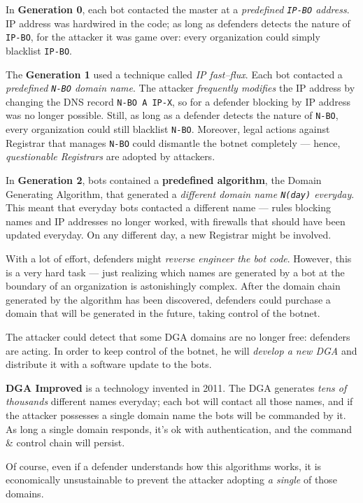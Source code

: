 \documentclass[10pt]{extreport}
\begin{document}
In \textbf{Generation 0}, each bot contacted the master at a \emph{predefined
\texttt{IP-BO} address}. IP address was hardwired in the code; as long as
defenders detects the nature of \texttt{IP-BO}, for the attacker it was game
over: every organization could simply blacklist \texttt{IP-BO}.

The \textbf{Generation 1} used a technique called \emph{IP fast--flux}. Each
bot contacted a \emph{predefined \texttt{N-BO} domain name}. The attacker
\emph{frequently modifies} the IP address by changing the DNS record
\texttt{N-BO A IP-X}, so for a defender blocking by IP address was no longer
possible. Still, as long as a defender detects the nature of \texttt{N-BO}, every
organization could still blacklist \texttt{N-BO}. Moreover, legal actions
against Registrar that manages \texttt{N-BO} could dismantle the botnet
completely --- hence, \emph{questionable Registrars} are adopted by attackers.

In \textbf{Generation 2}, bots contained a \textbf{predefined algorithm}, the
Domain Generating Algorithm, that generated a \emph{different domain name
\texttt{N(day)} everyday}. This meant that everyday bots contacted a different
name --- rules blocking names and IP addresses no longer worked, with firewalls
that should have been updated everyday. On any different day, a new Registrar
might be involved.

With a lot of effort, defenders might \emph{reverse engineer the bot code}.
However, this is a very hard task --- just realizing which names are generated
by a bot at the boundary of an organization is astonishingly complex. After the
domain chain generated by the algorithm has been discovered, defenders could
purchase a domain that will be generated in the future, taking control of the
botnet.

The attacker could detect that some DGA domains are no longer free: defenders
are acting. In order to keep control of the botnet, he will \emph{develop a new
DGA} and distribute it with a software update to the bots.

\textbf{DGA Improved} is a technology invented in 2011. The DGA generates
\emph{tens of thousands} different names everyday; each bot will contact all
those names, and if the attacker possesses a single domain name the bots will
be commanded by it. As long a single domain responds, it's ok with
authentication, and the command \& control chain will persist.

Of course, even if a defender understands how this algorithms works, it is
economically unsustainable to prevent the attacker adopting \emph{a single}
of those domains.
\end{document}
